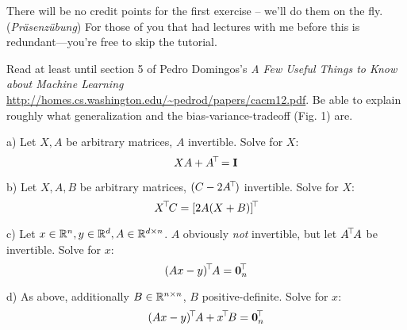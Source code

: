 

\renewcommand{\course}{Machine Learning}
\renewcommand{\exnum}{1}

\exercises
{}
\exercisestitle

There will be no credit points for the first exercise -- we'll do them
on the fly. (\emph{Pr\"asenz\"ubung}) For those of you that had
lectures with me before this is redundant---you're free to skip the
tutorial.







Read at least until section 5 of Pedro Domingos's \emph{A Few Useful
Things to Know about Machine Learning}
{\small\url{http://homes.cs.washington.edu/~pedrod/papers/cacm12.pdf}}. 
Be able to explain roughly what generalization and the bias-variance-tradeoff
(Fig. 1) are.



a) Let $X,A$ be arbitrary matrices, $A$ invertible. Solve for $X$:
$$ X A + A^{\!\top\!} = {\rm\bf I} $$

b) Let $X,A,B$ be arbitrary matrices, $(C-2A^{\!\top\!})$ invertible. Solve for $X$:
$$ X^{\!\top\!} C = [2 A (X + B)]^{\!\top\!} $$

c) Let $x\in{\mathbb{R}}^n,y\in{\mathbb{R}}^d,A\in{\mathbb{R}}^{d\times n}$. $A$ obviously \emph{not}
invertible, but let $A^{\!\top\!} A$ be invertible. Solve for $x$:
$$ (A x - y)^{\!\top\!} A = \boldsymbol 0_n^{\!\top\!} $$

d) As above, additionally $B\in{\mathbb{R}}^{n\times n}$, $B$
positive-definite. Solve for $x$: 
$$ (A x - y)^{\!\top\!} A + x^{\!\top\!} B = \boldsymbol 0_n^{\!\top\!} $$


